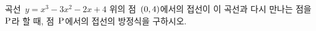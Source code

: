 곡선~$y=x^3-3x^2-2x+4$ 위의 점~$(0{,}\mkern3mu\mathopen{}4)$에서의 접선이 이 곡선과 다시 만나는 점을 $\mathrm{P}$라 할 때, 점~$\mathrm{P}$에서의 접선의 방정식을 구하시오.
